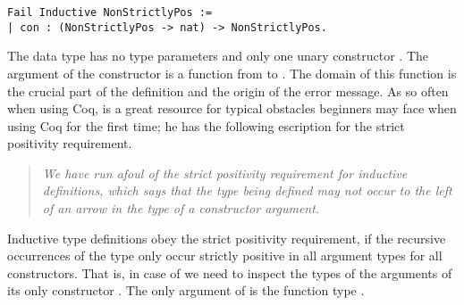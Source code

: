 \begin{verbatim}
Fail Inductive NonStrictlyPos :=
| con : (NonStrictlyPos -> nat) -> NonStrictlyPos.
\end{verbatim}

The data type  has no type parameters and only one unary constructor .
The argument of the constructor  is a function from  to .
The domain of this function is the crucial part of the definition and the origin of the error message.
As so often when using Coq, \citet{chlipala2011certified} is a great resource for typical obstacles beginners may face when using Coq for the first time; he has the following escription for the strict positivity requirement.

\begin{quote}
\emph{We have run afoul of the strict positivity requirement for inductive definitions, which says that the type being defined may not occur to the left of an arrow in the type of a constructor argument.}
\end{quote}

Inductive type definitions obey the strict positivity requirement, if the recursive occurrences of the type only occur strictly positive in all argument types for all constructors.
That is, in case of  we need to inspect the types of the arguments of its only constructor .
The only argument of  is the function type .

